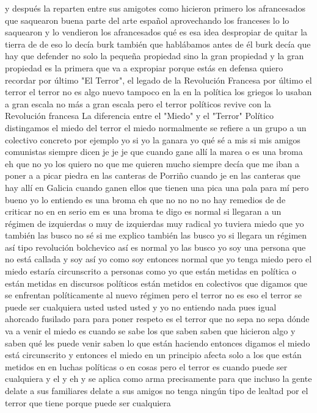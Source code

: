 y después la reparten entre sus amigotes como hicieron primero los afrancesados que saquearon buena parte del arte español
aprovechando los franceses lo lo saquearon y lo vendieron los afrancesados
qué es esa idea despropiar de quitar la tierra de de eso lo decía burk
también que hablábamos antes de él burk decía que hay que defender no solo la pequeña propiedad sino la gran propiedad
y la gran propiedad es la primera que va a expropiar porque estás en defensa quiero recordar por último
"El Terror", el legado de la Revolución Francesa
por último el terror
el terror no es algo nuevo tampoco en la en la política los griegos lo usaban a gran escala
no más a gran escala pero el terror políticos revive con la Revolución francesa
La diferencia entre el "Miedo" y el "Terror" Político
distingamos el miedo del terror el miedo normalmente se refiere a un grupo a un colectivo concreto por ejemplo yo
si yo la ganara yo qué sé a mis si mis amigos comunistas siempre dicen je je je
que cuando gane allí la marea o es una broma eh que no yo los quiero no que me quieren mucho siempre decía que me iban a poner a a picar piedra
en las canteras de Porriño cuando je en las canteras que hay allí en Galicia cuando ganen ellos que tienen una pica
una pala para mí pero bueno yo lo entiendo es una broma eh que no no
no no hay remedios de de criticar no en en serio em es una broma te digo
es normal si llegaran a un régimen de izquierdas o muy de izquierdas muy radical yo tuviera miedo
que yo también las busco no sé si me explico también las busco yo
si llegara un régimen así tipo revolución bolchevico así es normal yo las busco yo soy una persona que no está callada
y soy así yo como soy entonces normal que yo tenga miedo pero el miedo estaría circunscrito a personas como yo
que están metidas en política o están metidas en discursos políticos están metidos en colectivos que digamos que se enfrentan políticamente al nuevo régimen
pero el terror no es eso el terror se puede ser cualquiera usted usted usted y yo no entiendo nada pues igual
ahorcado fusilado para para poner respeto es el terror que no sepa no sepa dónde va a venir el miedo es cuando se sabe
los que saben saben que hicieron algo y saben qué les puede venir saben lo que están haciendo entonces digamos el miedo está circunscrito
y entonces el miedo en un principio afecta solo a los que están metidos en en luchas políticas o en cosas
pero el terror es cuando puede ser cualquiera y el y eh y se aplica como arma precisamente para que incluso
la gente delate a sus familiares delate a sus amigos no tenga ningún tipo de lealtad por el terror que tiene porque puede ser cualquiera
